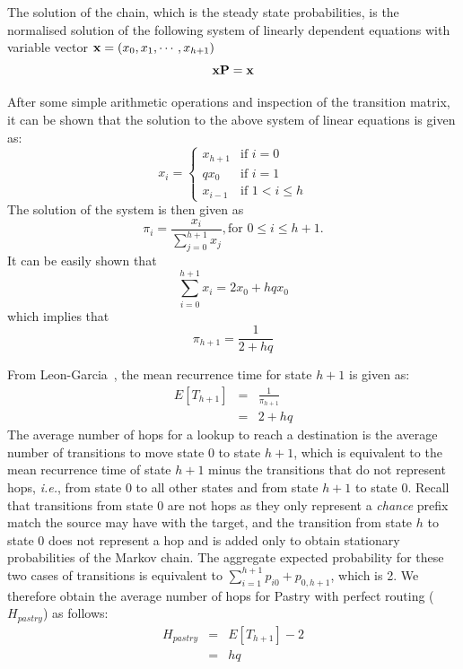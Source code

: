 \documentclass[10pt,twocolumn]{article}
\begin{document}
The solution of the chain, which is the steady state probabilities, is the
normalised solution of the following system of linearly dependent equations
with variable vector ${\bf x} = (x_0, x_1, \cdots,x_{h+1})$
\begin{equation}
\nonumber {\bf xP} = {\bf x}
\end{equation}

After some simple arithmetic operations and inspection of the transition
matrix, it can be shown that the solution to the above system of linear
equations is given as:
\[x_i = \left\{ \begin{array}{ll}
         x_{h+1}  & \mbox{if $i = 0$}\\
         qx_0  & \mbox{if $i = 1$} \\
         x_{i-1}  & \mbox{if  $1 < i \le h$} \end{array} \right. \]
The solution of the system is then given as
\begin{equation}
\nonumber \pi_i = \frac{x_i}{\sum_{j=0}^{h+1}{x_j}}, \mbox{for $0 \le i \le
h+1$}.
\end{equation}
It can be easily shown that
\begin{equation}
\nonumber \sum_{i=0}^{h+1}x_i = 2x_0 + hqx_0
\end{equation}
which implies that
\begin{equation}
\nonumber
 \pi_{h+1} = \frac{1}{2+hq}
\end{equation}

From Leon-Garcia~\cite{Garcia94Probability}, the mean recurrence time for state
$h+1$ is given as:
\begin{eqnarray}
\nonumber
E[T_{h+1}] &=& \frac{1}{\pi_{h+1}}\\
\nonumber
         &=& 2+hq
\end{eqnarray}
The average number of hops for a lookup to reach a destination is the average
number of transitions to move state $0$ to state $h+1$, which is equivalent to
the mean recurrence time of state $h+1$ minus the transitions that do not
represent hops, \emph{i.e.}, from state 0 to all other states and from state
$h+1$ to state 0. Recall that transitions from state $0$ are not hops as they
only represent a {\em chance} prefix match the source may have with the target,
and the transition from state $h$ to state $0$ does not represent a hop and is
added only  to obtain stationary probabilities of the Markov chain. The
aggregate expected probability for these two cases of transitions is equivalent
to $\sum_{i=1}^{h+1}p_{i0} + p_{0,h+1}$, which is 2. We therefore obtain the
average number of hops for Pastry with perfect routing ($H_{pastry}$) as
follows:
\begin{eqnarray}
\nonumber
H_{pastry} &=& E[T_{h+1}] - 2 \\
\label{eqn.pastr}
  &=& hq
\end{eqnarray}
\end{document}
